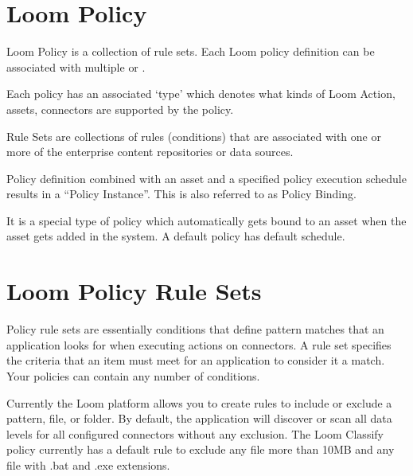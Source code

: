 \documentclass[letterpaper,10pt,english]{sphinxmanual}
\begin{document}
\section{Loom Policy}
\label{\detokenize{mcdmp_concepts:loom-policy}}\label{\detokenize{mcdmp_concepts:term-loom-policy}}

Loom Policy is a collection of rule sets. Each Loom policy definition can be associated with multiple {\hyperref[\detokenize{mcdmp_concepts:term-loom-asset}]{}} or {\hyperref[\detokenize{mcdmp_concepts:term-loom-connectors}]{}}.


Each policy has an associated ‘type’ which denotes what kinds of Loom Action, assets, connectors are supported by the policy.


Rule Sets are collections of rules (conditions) that are associated with one or more of the enterprise content repositories or data sources.


Policy definition combined with an asset and a specified policy execution schedule results in a “Policy Instance”. This is also referred to as Policy Binding.


It is a special type of policy which automatically gets bound to an asset when the asset gets added in the system. A default policy has default schedule.


\section{Loom Policy Rule Sets}
\label{\detokenize{mcdmp_concepts:term-policy-rule-sets}}\label{\detokenize{mcdmp_concepts:loom-policy-rule-sets}}
Policy rule sets are essentially conditions that define pattern matches that an application looks for when executing actions on connectors. A rule set specifies the criteria that an item must meet for an application to consider it a match. Your policies can contain any number of conditions.

Currently the Loom platform allows you to create rules to include or exclude a pattern, file, or folder. By default, the application will discover or scan all data levels for all configured connectors without any exclusion. The Loom Classify policy currently has a default rule to exclude any file more than 10MB and any file with .bat and .exe extensions.
\end{document}
